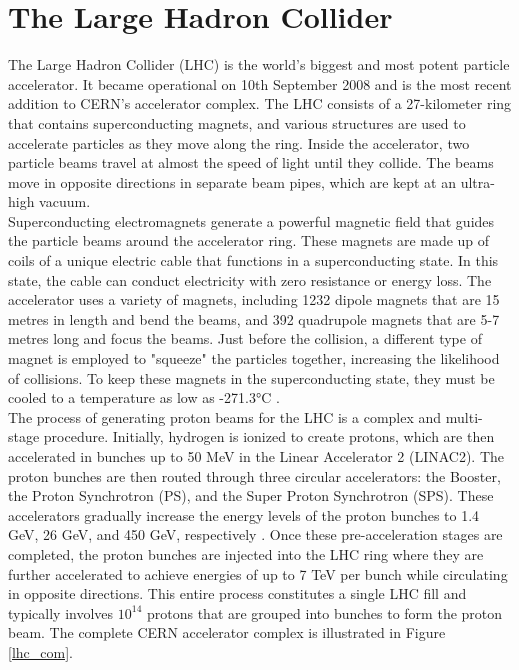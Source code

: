 \section{The Large Hadron Collider}
 
The Large Hadron Collider (LHC) is the world's biggest and most potent particle accelerator. It became operational on 10th September 2008 and is the most recent addition to CERN's accelerator complex. The LHC consists of a 27-kilometer ring that contains superconducting magnets, and various structures are used to accelerate particles as they move along the ring. Inside the accelerator, two particle beams travel at almost the speed of light until they collide. The beams move in opposite directions in separate beam pipes, which are kept at an ultra-high vacuum.\\ 

Superconducting electromagnets generate a powerful magnetic field that guides the particle beams around the accelerator ring. These magnets are made up of coils of a unique electric cable that functions in a superconducting state. In this state, the cable can conduct electricity with zero resistance or energy loss. The accelerator uses a variety of magnets, including 1232 dipole magnets that are 15 metres in length and bend the beams, and 392 quadrupole magnets that are 5-7 metres long and focus the beams. Just before the collision, a different type of magnet is employed to "squeeze" the particles together, increasing the likelihood of collisions. To keep these magnets in the superconducting state, they must be cooled to a temperature as low as -271.3°C \cite{LHC}.\\

The process of generating proton beams for the LHC is a complex and multi-stage procedure. Initially, hydrogen is ionized to create protons, which are then accelerated in bunches up to 50 MeV in the Linear Accelerator 2 (LINAC2). The proton bunches are then routed through three circular accelerators: the Booster, the Proton Synchrotron (PS), and the Super Proton Synchrotron (SPS). These accelerators gradually increase the energy levels of the proton bunches to 1.4 GeV, 26 GeV, and 450 GeV, respectively \cite{lhc_complex}. Once these pre-acceleration stages are completed, the proton bunches are injected into the LHC ring where they are further accelerated to achieve energies of up to 7 TeV per bunch while circulating in opposite directions. This entire process constitutes a single LHC fill and typically involves $10^{14}$ protons that are grouped into bunches to form the proton beam. The complete CERN accelerator complex is illustrated in Figure \ref{lhc_com}.

